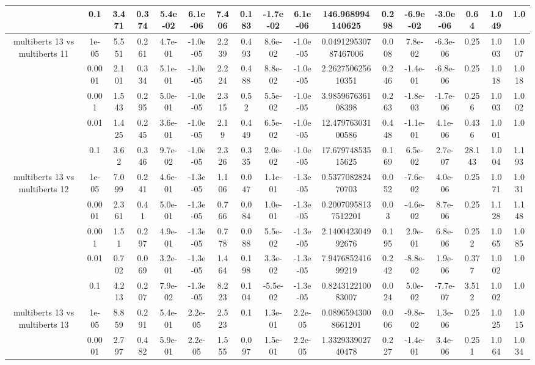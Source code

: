\begin{tabular}{|c|c|c|c|c|c|c|c|c|c|c|c|c|c|c|c|c|}
 & 0.1 & 3.471 & 0.374 & 5.4e-02 & 6.1e-06 & 7.406 & 0.183 & -1.7e-02 & 6.1e-06 & 146.968994140625 & 0.298 & -6.9e-02 & -3.0e-06 & 0.64 & 1.049 & 1.0 \\
\hline
\multirow{5}{*}{multiberts 13 vs multiberts 11} & 1e-05 & 5.551 & 0.261 & 4.7e-01 & -1.0e-05 & 2.239 & 0.493 & 8.6e-02 & -1.0e-05 & 0.049129530787467006 & 0.008 & 7.8e-02 & -6.3e-06 & 0.25 & 1.003 & 1.007 \\
 & 0.0001 & 2.101 & 0.334 & 5.1e-01 & -1.0e-05 & 2.224 & 0.488 & 8.8e-02 & -1.0e-05 & 2.262750625610351 & 0.246 & -1.4e-01 & -6.8e-06 & 0.25 & 1.018 & 1.018 \\
 & 0.001 & 1.543 & 0.295 & 5.0e-01 & -1.0e-05 & 2.315 & 0.52 & 5.5e-02 & -1.0e-05 & 3.985967636108398 & 0.263 & -1.8e-03 & -1.7e-06 & 0.256 & 1.003 & 1.002 \\
 & 0.01 & 1.425 & 0.245 & 3.6e-01 & -1.0e-05 & 2.19 & 0.449 & 6.5e-02 & -1.0e-05 & 12.47976303100586 & 0.448 & -1.1e-01 & 4.1e-06 & 0.436 & 1.001 & 1.0 \\
 & 0.1 & 3.62 & 0.346 & 9.7e-02 & -1.0e-05 & 2.326 & 0.335 & 2.0e-02 & -1.0e-05 & 17.67974853515625 & 0.169 & 6.5e-02 & 2.7e-07 & 28.143 & 1.004 & 1.193 \\
\hline
\multirow{5}{*}{multiberts 13 vs multiberts 12} & 1e-05 & 7.099 & 0.241 & 4.6e-01 & -1.3e-05 & 1.106 & 0.047 & 1.1e-01 & -1.3e-05 & 0.537708282470703 & 0.052 & -7.6e-02 & 4.0e-06 & 0.25 & 1.071 & 1.031 \\
 & 0.0001 & 2.361 & 0.41 & 5.0e-01 & -1.3e-05 & 0.766 & 0.084 & 1.0e-01 & -1.3e-05 & 0.20070958137512201 & 0.03 & -4.6e-02 & 8.7e-06 & 0.25 & 1.128 & 1.148 \\
 & 0.001 & 1.51 & 0.297 & 4.9e-01 & -1.3e-05 & 0.778 & 0.088 & 5.5e-02 & -1.3e-05 & 2.140042304992676 & 0.195 & 2.9e-01 & 6.8e-06 & 0.252 & 1.065 & 1.085 \\
 & 0.01 & 0.702 & 0.069 & 3.2e-01 & -1.3e-05 & 1.464 & 0.198 & 3.3e-02 & -1.3e-05 & 7.947685241699219 & 0.242 & -8.8e-02 & 1.9e-06 & 0.377 & 1.002 & 1.0 \\
 & 0.1 & 4.213 & 0.207 & 7.9e-02 & -1.3e-05 & 8.223 & 0.104 & -5.5e-02 & -1.3e-05 & 0.824312210083007 & 0.024 & 5.0e-02 & -7.7e-07 & 3.512 & 1.002 & 1.0 \\
\hline
\multirow{5}{*}{multiberts 13 vs multiberts 13} & 1e-05 & 8.859 & 0.291 & 5.4e-01 & 2.2e-05 & 2.523 & 0.1 & 1.3e-01 & 2.2e-05 & 0.08965943008661201 & 0.006 & -9.8e-02 & 1.3e-06 & 0.25 & 1.025 & 1.015 \\
 & 0.0001 & 2.797 & 0.482 & 5.9e-01 & 2.2e-05 & 1.555 & 0.097 & 1.5e-01 & 2.2e-05 & 1.332933902740478 & 0.227 & -1.4e-01 & 3.4e-06 & 0.251 & 1.064 & 1.034 \\

\end{tabular}
